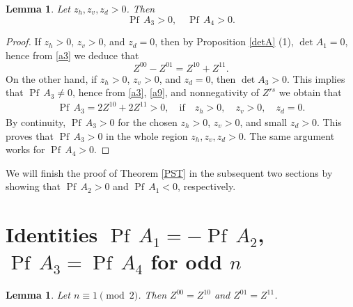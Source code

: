 \documentclass[12pt,reqno]{amsart}
\numberwithin{equation}{section}
\newcommand{\Pf}{{\operatorname{Pf}\,}}
\newtheorem{lem}[theo]{{\sc \bf Lemma}}
\begin{document}
\begin{lem}
Let $z_h,z_v,z_d>0$. Then 
\begin{equation}
\Pf A_3>0,\quad \Pf A_4>0.
\end{equation}
\end{lem}
\begin{proof}
If $z_h>0$, $z_v>0$, and $z_d=0$, then by Proposition \ref{detA} (1), 
$\det A_1=0$, hence from \eqref{a3} we deduce that
\begin{equation}\label{a13}
Z^{00}-Z^{01}=Z^{10}+Z^{11}. 
\end{equation}
On the other hand, if $z_h>0$, $z_v>0$, and $z_d=0$, then $\det A_3>0$. This implies that $\Pf A_3\not=0$, hence
from \eqref{a3}, \eqref{a9}, and nonnegativity of $Z^{rs}$ we obtain that
\begin{equation}\label{a14}
\begin{aligned}
\Pf A_3= 2Z^{10}+2Z^{11}>0,\quad \textrm{if}\quad z_h>0, \quad z_v>0,\quad z_d=0.
\end{aligned}
\end{equation}
By continuity, $\Pf A_3>0$ for the chosen $z_h>0$, $z_v>0$, and small $z_d>0$.
This proves that $\Pf A_3>0$ in the whole region
$z_h,z_v,z_d>0$. The same argument works for $\Pf A_4>0$.
\end{proof}
We will finish the proof of Theorem \ref{PST} in the subsequent two sections by showing that $\Pf A_2>0$ and $\Pf A_1<0$, respectively.

\section{Identities $\Pf A_1=-\Pf A_2$, $\Pf A_3=\Pf A_4$ for odd $n$} \label{Id}

\begin{lem}\label{bijection}
Let $n\equiv 1\pmod 2$. Then $Z^{00}=Z^{10}$ and $Z^{01}=Z^{11}$.
\end{lem}
\end{document}
